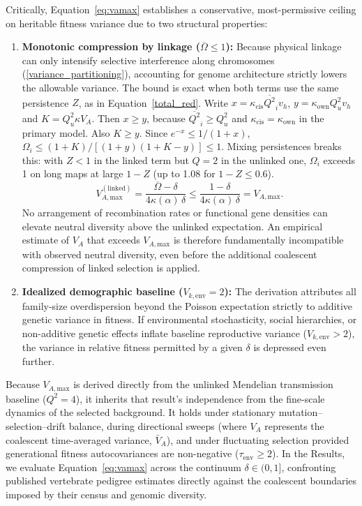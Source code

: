 \documentclass[12pt]{article}
\begin{document}
Critically, Equation~\eqref{eq:vamax} establishes a conservative, most-permissive ceiling on heritable fitness variance due to two structural properties:
\begin{enumerate}
    \item \textbf{Monotonic compression by linkage ($\overline{\Omega} \le 1$):} Because physical linkage can only intensify selective interference along chromosomes (\autoref{variance_partitioning}), accounting for genome architecture strictly lowers the allowable variance. The bound is exact when both terms use the same persistence $Z$, as in Equation~\eqref{total_red}. Write $x = \kappa_\text{cis}\overline{Q^2}_iv_h$, $y = \kappa_\text{own}Q_u^2v_h$ and $K = Q_u^2\kappa V_A$. Then $x \ge y$, because $\overline{Q^2}_i \ge Q_u^2$ and $\kappa_\text{cis} = \kappa_\text{own}$ in the primary model. Also $K \ge y$. Since $e^{-x} \le 1/(1+x)$, $\Omega_i \le (1+K)/[(1+y)(1+K-y)] \le 1$. Mixing persistences breaks this: with $Z < 1$ in the linked term but $Q = 2$ in the unlinked one, $\Omega_i$ exceeds 1 on long maps at large $1 - Z$ (up to 1.08 for $1 - Z \le 0.6$).
    \begin{equation}
    V_{A,\text{max}}^{(\text{linked})} = \frac{\overline{\Omega} - \delta}{4\kappa(\alpha)\,\delta} \le \frac{1 - \delta}{4\kappa(\alpha)\,\delta} = V_{A,\text{max}}.
    \end{equation}
    No arrangement of recombination rates or functional gene densities can elevate neutral diversity above the unlinked expectation. An empirical estimate of $V_A$ that exceeds $V_{A,\text{max}}$ is therefore fundamentally incompatible with observed neutral diversity, even before the additional coalescent compression of linked selection is applied.
    \item \textbf{Idealized demographic baseline ($V_{k,\text{env}} = 2$):} The derivation attributes all family-size overdispersion beyond the Poisson expectation strictly to additive genetic variance in fitness. If environmental stochasticity, social hierarchies, or non-additive genetic effects inflate baseline reproductive variance ($V_{k,\text{env}} > 2$), the variance in relative fitness permitted by a given $\delta$ is depressed even further.
\end{enumerate}

Because $V_{A,\text{max}}$ is derived directly from the unlinked Mendelian transmission baseline ($Q^2 = 4$), it inherits that result's independence from the fine-scale dynamics of the selected background. It holds under stationary mutation--selection--drift balance, during directional sweeps (where $V_A$ represents the coalescent time-averaged variance, $\bar{V}_A$), and under fluctuating selection provided generational fitness autocovariances are non-negative ($\tau_\text{env} \ge 2$). In the Results, we evaluate Equation~\eqref{eq:vamax} across the continuum $\delta \in (0, 1]$, confronting published vertebrate pedigree estimates directly against the coalescent boundaries imposed by their census and genomic diversity.
\end{document}

